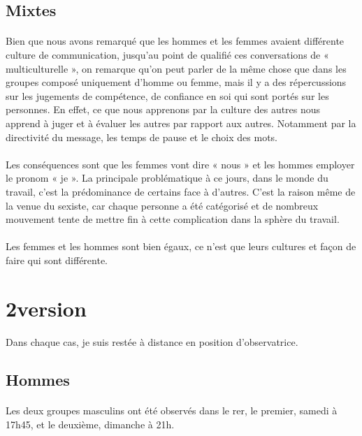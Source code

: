 \subsection{Mixtes}
\paragraph{}
Bien que nous avons remarqué que les hommes et les femmes avaient différente culture de communication,
jusqu'au point de qualifié ces conversations de « multiculturelle », on remarque qu'on peut parler de la même
chose que dans les groupes composé uniquement d'homme ou femme, mais il y a des répercussions sur les
jugements de compétence, de confiance en soi qui sont portés sur les personnes. En effet, ce que nous
apprenons par la culture des autres nous apprend à juger et à évaluer les autres par rapport aux autres.
Notamment par la directivité du message, les temps de pause et le choix des mots.

\paragraph{}
Les conséquences sont que les femmes vont dire « nous » et les hommes employer le pronom « je ». La
principale problématique à ce jours, dans le monde du travail, c'est la prédominance de certains face à
d'autres. C'est la raison même de la venue du sexiste, car chaque personne a été catégorisé et de nombreux
mouvement tente de mettre fin à cette complication dans la sphère du travail.

\paragraph{}
Les femmes et les hommes sont bien égaux, ce n'est que leurs cultures et façon de faire qui sont différente.

\section{2\ieme version}
\paragraph{}
Dans chaque cas, je suis restée à distance en position d’observatrice.
\subsection{Hommes}
\paragraph{}
Les deux groupes masculins ont été observés dans le rer, le premier, samedi à 17h45, et le deuxième, dimanche à 21h.
